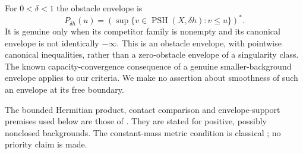 \documentclass[11pt]{article}
\newcommand{\PSH}{\operatorname{PSH}}
\newcommand{\1}{\mathbf 1}
\theoremstyle{remark}\newtheorem{remark}[theorem]{Remark}
\begin{document}
For $0<\delta<1$ the obstacle envelope is
\[
 P_{\delta h}(u)=\left(\sup\{v\in\PSH(X,\delta h):v\leq u\}\right)^*.
\]
It is genuine only when its competitor family is nonempty and its canonical
envelope is not identically $-\infty$. This is an obstacle envelope, with
pointwise canonical inequalities, rather than a zero-obstacle envelope of
a singularity class. The known capacity-convergence consequence of a genuine
smaller-background envelope applies to our criteria. We make no assertion
about smoothness of such an envelope at its free boundary.

The bounded Hermitian product, contact comparison and envelope-support
premises used below are those of \cite[\S\S1--2]{GL}.
They are stated for positive, possibly nonclosed backgrounds.
The constant-mass metric condition is classical
\cite[Proposition 3.3(4) and its discussion]{GL}; no priority claim is made.
\end{document}
